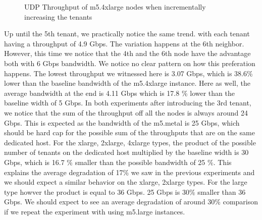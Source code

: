 \begin{figure}[H]
\centering
{}
\caption{UDP Throughput of m5.4xlarge nodes when incrementally increasing the tenants}
\end{figure}
\noindent
Up until the 5th tenant, we practically notice the same trend. with each tenant having a throughput of 
4.9 Gbps. The variation happens at the 6th neighbor. However, this time we notice that the 4th and the 6th
node have the advantage both with 6 Gbps bandwidth. We notice no clear pattern on how this preferation 
happens. The lowest throughput we witnessed here is 3.07 Gbps, which is 38.6\% lower than the baseline 
bandwidth of the m5.4xlarge instance. Here as well, the average bandwidth at the end is 4.11 Gbps which is 
17.8 \% lower than the baseline width of 5 Gbps. 
In both experiments after introducing the 3rd tenant, we notice that the sum of the throughput 
off all the nodes is always around 24 Gbps.  This is expected as the bandwidth of the 
m5.metal is 25 Gbps, which should be hard cap for the possible sum of the throughputs that are 
on the same dedicated host. For the xlarge, 2xlarge, 4xlarge types, the product of the possible 
number of tenants on the dedicated host multiplied by the baseline width is 30 Gbps, which is 16.7 \% smaller
than the possible bandwidth of 25 \%. This explains the average degradation of 17\% we saw in the previous
experiments and we should expect a similar behavior on the xlarge, 2xlarge types. For the large type 
howver the product is equal to 36 Gbps. 25 Gbps is 30\% smaller than 36 Gbps. We should expect 
to see an average degradation of around 30\% comparison if we repeat the experiment with using m5.large
instances.  